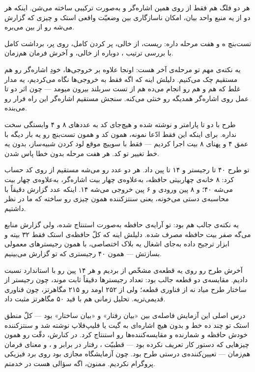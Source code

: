 \documentclass[12pt,a4paper]{article}
\newcommand{\cue}[2]{%
  \par\addvspace{1.1em}%
  \noindent{\small\bfseries\color{cuecolor}\lr{#1}\quad\textbullet\quad #2}%
  \par\nobreak\addvspace{0.3em}%
}
\begin{document}
هر دو فلگ هم فقط از روی همین اشاره‌گر و به‌صورت ترکیبی ساخته می‌شن. اینکه هر دو از یه منبع واحد بیان، امکان ناسازگاری بین وضعیّت واقعی استک و چیزی که گزارش می‌شه رو از بین می‌بره.

\cue{2:35}{تست‌بنچ}
تست‌بنچ ه و هفت مرحله داره: ریست،  از خالی، پر کردن کامل،  روی پر، برداشت کامل با بررسی ترتیب ، دوباره  از خالی، و آخرش فرمان هم‌زمان.

یه نکته‌ی مهم تو مرحله‌ی آخر هست: اونجا علاوه بر خروجی‌ها، خودِ اشاره‌گر رو هم مستقیم چک می‌کنیم. دلیلش اینه که اگه فقط به خروجی‌ها نگاه می‌کردیم، یه مدار غلط که هم  و هم  رو انجام می‌ده هم از تست سربلند بیرون میومد --- چون اثر دو تا عمل روی اشاره‌گر همدیگه رو خنثی می‌کنه. سنجش مستقیم اشاره‌گر این راه فرار رو می‌بنده.

\cue{3:25}{پارامتری بودن}
طرح با دو تا پارامتر  و  نوشته شده و هیچ‌جای کد به عددهای ۸ و ۴ وابستگی سخت نداره. برای اینکه این فقط ادّعا نمونه، همون کد و همون تست‌بنچ رو یه بار دیگه با عمق ۴ و پهنای ۸ بیت اجرا کردیم --- فقط با سوییچ  موقع لود کردن شبیه‌ساز، بدون یه خط تغییر تو کد. هر هفت مرحله بدون خطا پاس شدن.

\cue{3:55}{سنتز}
تو  طرح ۴۰ تا رجیستر و ۱۴ تا پین داد. هر دو عدد رو می‌شه مستقیم از روی کد حساب کرد: ۸ خانه‌ی چهاربیتی حافظه، به‌علاوه‌ی چهار بیت اشاره‌گر، به‌علاوه‌ی چهار بیت  می‌شه ۴۰؛ و ۸ پین ورودی و ۶ پین خروجی می‌شه ۱۴. اینکه عدد گزارش دقیقاً با محاسبه‌ی دستی می‌خونه، یعنی سنتزکننده همون چیزی رو ساخته که ما در نظر داشتیم.

یه نکته‌ی جالب هم بود: تو  آرایه‌ی حافظه به‌صورت  استنتاج شده، ولی گزارش منابع می‌گه صفر بیت حافظه مصرف شده. دلیلش اینه که کلّ حافظه‌ی استک فقط ۳۲ بیته و ابزار ترجیح داده به‌جای اشغال یه بلاک  اختصاصی، با همون رجیسترهای معمولی بسازتش --- همون ۴۰ رجیستری که تو گزارش می‌بینیم.

آخرش طرح رو روی یه قطعه‌ی مشخّص از  بردیم و هر ۱۴ پین رو با استاندارد  نسبت دادیم. مقایسه‌ی دو قطعه جالب بود: تعداد رجیسترها دقیقاً ثابت موند، چون رجیستر از ساختار طرح میاد نه از فناوری قطعه؛ ولی  از ۲۵۲ اومد رو ۲۱۵ مگاهرتز، چون  فناوری قدیمی‌تریه. تحلیل زمانی هم با قید ۵۰ مگاهرتز  مثبت داد.

\cue{4:45}{جمع‌بندی}
درس اصلی این آزمایش فاصله‌ی بین «بیان رفتار» و «بیان ساختار» بود --- کلّ منطق استک تو چند ده خط و بدون هیچ اشاره‌ای به گیت یا فلیپ‌فلاپ نوشته شد و سنتزکننده خودش حافظه و شمارنده و مقایسه‌کننده‌ها رو استنتاج کرد. در کنارش، دقّت رو همون چیزهایی که دستور کار تعریف نکرده بود --- قطبیّت ، رفتار در برابر  و ، و معنای فرمان هم‌زمان --- تعیین‌کننده‌ی درستی طرح بود. چون آزمایشگاه مجازی بود روی برد فیزیکی پروگرام نکردیم. ممنون، اگه سؤالی هست در خدمتم.
\end{document}
